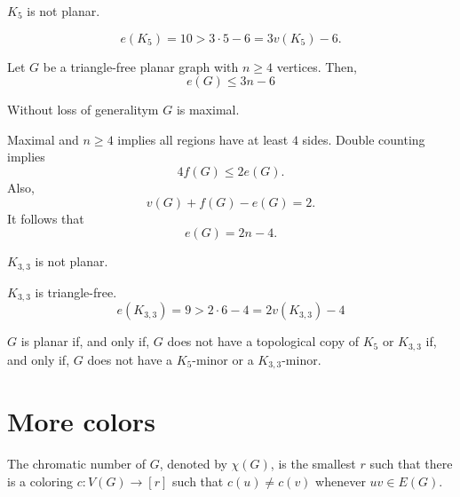\begin{thm}
	$K_5$ is not planar.
\end{thm}
\begin{dem}
	\[
		e(K_5) = 10 > 3\cdot5 - 6 = 3v(K_5) - 6.
	\]
\end{dem}

\begin{thm}
	Let $G$ be a triangle-free planar graph with $n \ge 4$ vertices. Then, \[
		e(G) \le 3n - 6
	\]
\end{thm}

\begin{dem}
	Without loss of generalitym $G$ is maximal.

	Maximal and $n \ge 4$ implies all regions have at least $4$ sides. Double counting implies \[
		4f(G) \le 2e(G).
	\]
	Also, \[
		v(G) + f(G) - e(G) = 2.
	\]
	It follows that	\[
		e(G) = 2n - 4.
	\]
\end{dem}

\begin{thm}
	$K_{3, 3}$ is not planar.
\end{thm}
\begin{dem}
	$K_{3, 3}$ is triangle-free.
	\[
		e(K_{3, 3}) = 9 > 2\cdot6 - 4 = 2v(K_{3, 3}) - 4
	\] 
\end{dem}

\begin{thm}
	$G$ is planar if, and only if, $G$ does not have a topological copy of $K_5$ or $K_{3, 3}$ if, and only if, $G$ does not have a $K_5$-minor or a $K_{3, 3}$-minor.
\end{thm}

\newpage
\section{More colors}

\begin{defn}
	The chromatic number of $G$, denoted by $\chi(G)$, is the smallest $r$ such that there is a coloring $c \colon V(G) \to [r]$ such that $c(u) \neq c(v)$ whenever $uv \in E(G)$.
\end{defn}

